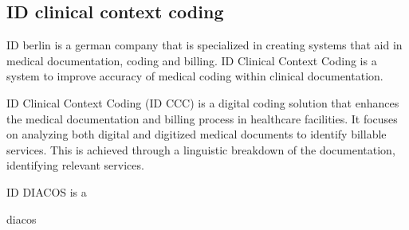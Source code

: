 \subsection{ID clinical context coding}
ID berlin is a german company that is specialized in creating systems that aid in medical documentation, coding and billing.
ID Clinical Context Coding is a system to improve accuracy of medical coding within clinical documentation.



ID Clinical Context Coding (ID CCC) is a digital coding solution that enhances the medical documentation and billing process in healthcare facilities.
It focuses on analyzing both digital and digitized medical documents to identify billable services.
This is achieved through a linguistic breakdown of the documentation, identifying relevant services. \cite{Diekmann2008}

ID DIACOS is a


diacos \cite{10.1007/978-3-642-82852-2_111}
